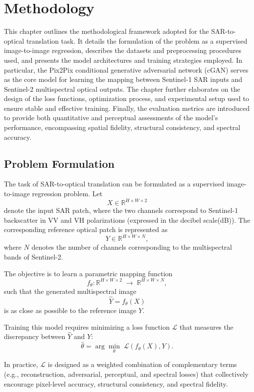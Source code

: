 \chapter{Methodology}
\label{chapter:methodology}
This chapter outlines the methodological framework adopted for the SAR-to-optical translation task. It details the formulation of the problem as a supervised image-to-image regression, describes the datasets and preprocessing procedures used, and presents the model architectures and training strategies employed. In particular, the Pix2Pix conditional generative adversarial network (cGAN) serves as the core model for learning the mapping between Sentinel-1 SAR inputs and Sentinel-2 multispectral optical outputs. The chapter further elaborates on the design of the loss functions, optimization process, and experimental setup used to ensure stable and effective training. Finally, the evaluation metrics are introduced to provide both quantitative and perceptual assessments of the model’s performance, encompassing spatial fidelity, structural consistency, and spectral accuracy.
\section{Problem Formulation}

The task of SAR-to-optical translation can be formulated as a supervised image-to-image regression problem. Let
\[
    X \in \mathbb{R}^{H \times W \times 2}
\]
denote the input SAR patch, where the two channels correspond to Sentinel-1 backscatter in VV and VH polarizations (expressed in the decibel scale(dB)). The corresponding reference optical patch is represented as
\[
    Y \in \mathbb{R}^{H \times W \times N},
\]
where \(N\) denotes the number of channels corresponding to the multispectral bands of {Sentinel-2}.

The objective is to learn a parametric mapping function
\[
    f_\theta : \mathbb{R}^{H \times W \times 2} \; \rightarrow \; \mathbb{R}^{H \times W \times N},
\]
such that the generated multispectral image
\[
    \hat{Y} = f_\theta(X)
\]
is as close as possible to the reference image \( Y \).

Training this model requires minimizing a loss function \(\mathcal{L}\) that measures the discrepancy between \(\hat{Y}\) and \(Y\):
\[
    \hat{\theta} = \arg\min_\theta \; \mathcal{L}(f_\theta(X), Y).
\]

In practice, \(\mathcal{L}\) is designed as a weighted combination of complementary terms (e.g., reconstruction, adversarial, perceptual, and spectral losses) that collectively encourage pixel-level accuracy, structural consistency, and spectral fidelity.

